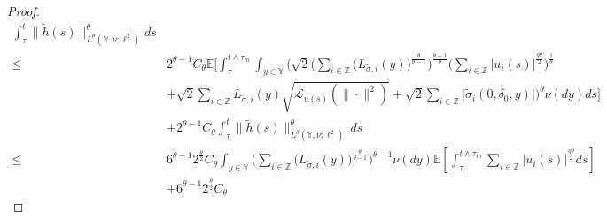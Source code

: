 \documentclass[11pt]{article}
\numberwithin{equation}{section}
\theoremstyle{plain}
\begin{document}
\begin{proof}
\begin{align}
	               \int_{\tau}^{t}
                         \big\| \widetilde{h}(s) \big\|^{\theta}_{L^{\theta}(  \mathbb{Y}, \nu; \ell^2)} ds
                                      \nonumber\\[1ex]
 \le & 2^{\theta-1} C_{\theta}
	            \mathbb{E} 
	                  \Bigg[ \int_{\tau}^{t \wedge \tau_m}
                                   \int_{y \in \mathbb{Y} }
	                                   \bigg( \sqrt{2}
	                                                   \Big( \sum_{i \in \mathbb{Z}}
	                                                                       \big( L_{\tilde{\sigma}, i}(y) \big)^{\frac{\theta}{\theta-1}}
	                                                   \Big)^{\frac{\theta-1}{\theta}}
	                                                   \Big( \sum_{i \in \mathbb{Z}}
	                                                                  |u_i(s)|^{\frac{q \theta}{2}}
	                                                  \Big)^{\frac{1}{\theta}}  \nonumber\\
	  &                                           + \sqrt{2} \sum_{i \in \mathbb{Z}} 
	                                                         L_{\tilde{\sigma}, i}(y)
	                                                               \sqrt{\mathcal{L}_{u(s)}(\|\cdot\|^2) }
	                                                + \sqrt{2} \sum_{i \in \mathbb{Z}}
	                                                         \big| \widetilde{\sigma}_{i}(0, \delta_0, y) \big|
	                                \bigg)^{\theta}
	                        \nu(dy) ds
               	 \Bigg]  \nonumber\\
	  & + 2^{\theta-1} C_{\theta} 
           	       \int_{\tau}^{t}
                       \big\| \widetilde{h}(s) \big\|
                       ^{\theta}_{L^{ \theta}( \mathbb{Y}, \nu; \ell^2)} \, ds
	                                    \nonumber\\[1ex]
 \le & 6^{\theta-1} 2^{\frac{\theta}{2}} C_{\theta}
                \int_{y \in \mathbb{Y} }
	                \Big( \sum_{i \in \mathbb{Z} }
	                              \big( L_{\tilde{\sigma}, i}(y) \big)^{\frac{\theta}{\theta-1}}
	               \Big)^{\theta-1}
	          \nu(dy)
	          \mathbb{E} 
	                \left[ \int_{\tau}^{t \wedge \tau_m}
	                             \sum_{i \in \mathbb{Z}}
	                                   |u_i(s)|^{\frac{q \theta}{2}} ds
	                \right]  \nonumber\\
	 & + 6^{\theta-1} 2^{\frac{\theta}{2}} C_{\theta}

\end{align}
\end{proof}
\end{document}
